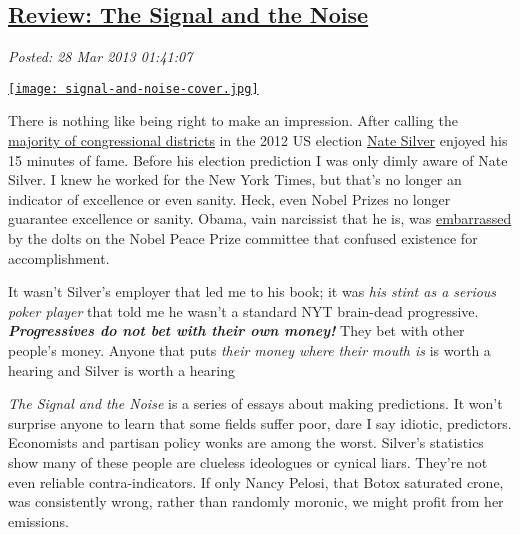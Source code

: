 %

\subsection*{\href{http://bakerjd99.wordpress.com/2013/03/27/review-the-signal-and-the-noise/}{Review: The Signal and the Noise}}


\noindent\emph{Posted: 28 Mar 2013 01:41:07}
\vspace{6pt}


\captionsetup[floatingfigure]{labelformat=empty}
\begin{floatingfigure}[l]{0.24\textwidth}
\centering
\href{http://bakerjd99.files.wordpress.com/2013/03/signal-and-noise-cover.jpg}{\texttt{[image: signal-and-noise-cover.jpg]}}
\label{fig:3901X0}
\end{floatingfigure} There
is nothing like being right to make an impression. After calling the
\href{http://www.huffingtonpost.com/2012/11/07/nate-silver-obama-reelection\_n\_2086556.html}{majority
of congressional districts} in the 2012 US election
\href{http://fivethirtyeight.blogs.nytimes.com/}{Nate Silver} enjoyed
his 15 minutes of fame. Before his election prediction I was only dimly
aware of Nate Silver. I knew he worked for the New York Times, but
that's no longer an indicator of excellence or even sanity. Heck, even
Nobel Prizes no longer guarantee excellence or sanity. Obama, vain
narcissist that he is, was
\href{http://online.wsj.com/article/SB10001424052748703746604574463171820234630.html}{embarrassed}
by the dolts on the Nobel Peace Prize committee that confused existence
for accomplishment.

It wasn't Silver's employer that led me to his book; it was \emph{his
stint as a serious poker player} that told me he wasn't a standard NYT
brain-dead progressive. \textbf{\emph{Progressives do not bet with their
own money!}} They bet with other people's money. Anyone that puts
\emph{their money where their mouth is} is worth a hearing and Silver is
worth a hearing

\emph{The Signal and the Noise} is a series of essays about making
predictions. It won't surprise anyone to learn that some fields suffer
poor, dare I say idiotic, predictors. Economists and partisan policy
wonks are among the worst. Silver's statistics show many of these people
are clueless ideologues or cynical liars. They're not even reliable
contra-indicators. If only Nancy Pelosi, that Botox saturated crone, was
consistently wrong, rather than randomly moronic, we might profit from
her emissions.

